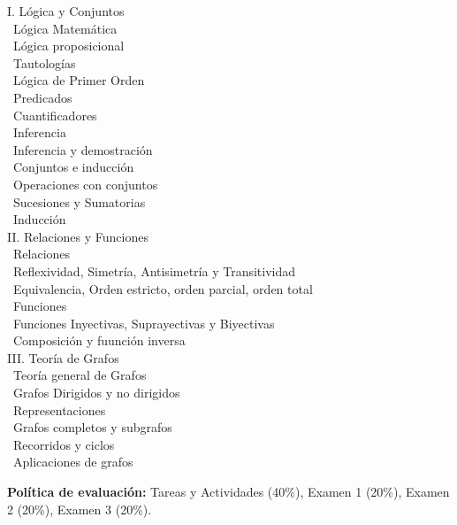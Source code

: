 \documentclass[12pt, letterpaper, oneside]{article}
\newcommand{\topic}{{\color{darkgreen}{\Rectangle}}}
\newcommand{\subtopic}{{\enskip \color{darkblue}{\Rectangle}}}
\begin{document}
  \begin{center} 
  \begin{minipage}{5in}
  \begin{flushleft}
  {\large I. Lógica y Conjuntos} \\[2ex]
  \topic ~Lógica Matemática \\
  \subtopic ~Lógica proposicional \\
  \subtopic ~Tautologías \\
  \topic ~Lógica de Primer Orden \\
  \subtopic ~Predicados \\
  \subtopic ~Cuantificadores \\
  \topic ~Inferencia \\
  \subtopic ~Inferencia y demostración \\
  \topic ~Conjuntos e inducción \\
  \subtopic ~Operaciones con conjuntos \\
  \subtopic ~Sucesiones y Sumatorias \\
  \subtopic ~Inducción \\[2.5ex]
  {\large II. Relaciones y Funciones} \\[2ex]
  \topic ~Relaciones \\
  \subtopic ~Reflexividad, Simetría, Antisimetría y Transitividad \\
  \subtopic ~Equivalencia, Orden estricto, orden parcial, orden total \\
  \topic ~Funciones \\
  \subtopic ~Funciones Inyectivas, Suprayectivas y Biyectivas \\
  \subtopic ~Composición y fuunción inversa \\[2.5ex]
  {\large III. Teoría de Grafos} \\[2ex]
  \topic ~Teoría general de Grafos \\
  \subtopic ~Grafos Dirigidos y no dirigidos \\
  \subtopic ~Representaciones \\
  \subtopic ~Grafos completos y subgrafos \\
  \subtopic ~Recorridos y ciclos \\
  \subtopic ~Aplicaciones de grafos \\
  \end{flushleft}
  \end{minipage}
  \end{center}

  \vspace*{.15in}
  \noindent\textbf{Política de evaluación:}
  Tareas y Actividades (40\%), Examen 1 (20\%), Examen 2 (20\%), Examen 3 (20\%).
  
\end{document}
